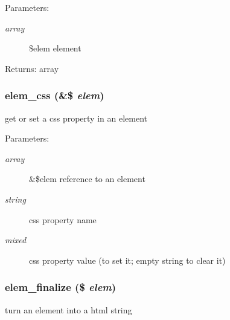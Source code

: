 \begin{Desc}
\item[Parameters:]
\begin{description}
\item[{\em array}]\$elem element \end{description}
\end{Desc}
\begin{Desc}
\item[Returns:]array \end{Desc}
\hypertarget{html_8inc_8php_c705ef06deb9e2d49e342ed78ecc1c9a}{
\subsubsection[{elem\_\-css}]{\setlength{\rightskip}{0pt plus 5cm}elem\_\-css (\&\$ {\em elem})}}
\label{html_8inc_8php_c705ef06deb9e2d49e342ed78ecc1c9a}


get or set a css property in an element

\begin{Desc}
\item[Parameters:]
\begin{description}
\item[{\em array}]\&\$elem reference to an element \item[{\em string}]css property name \item[{\em mixed}]css property value (to set it; empty string to clear it) \end{description}
\end{Desc}
\hypertarget{html_8inc_8php_f04b43a4dd09e73ca2cef84a4f2e9381}{
\subsubsection[{elem\_\-finalize}]{\setlength{\rightskip}{0pt plus 5cm}elem\_\-finalize (\$ {\em elem})}}
\label{html_8inc_8php_f04b43a4dd09e73ca2cef84a4f2e9381}


turn an element into a html string

